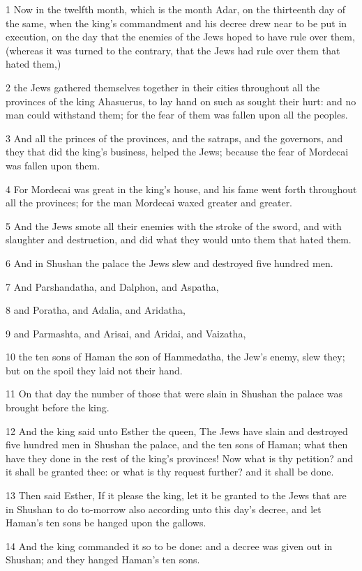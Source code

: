 \par 1 Now in the twelfth month, which is the month Adar, on the thirteenth day of the same, when the king's commandment and his decree drew near to be put in execution, on the day that the enemies of the Jews hoped to have rule over them, (whereas it was turned to the contrary, that the Jews had rule over them that hated them,)
\par 2 the Jews gathered themselves together in their cities throughout all the provinces of the king Ahasuerus, to lay hand on such as sought their hurt: and no man could withstand them; for the fear of them was fallen upon all the peoples.
\par 3 And all the princes of the provinces, and the satraps, and the governors, and they that did the king's business, helped the Jews; because the fear of Mordecai was fallen upon them.
\par 4 For Mordecai was great in the king's house, and his fame went forth throughout all the provinces; for the man Mordecai waxed greater and greater.
\par 5 And the Jews smote all their enemies with the stroke of the sword, and with slaughter and destruction, and did what they would unto them that hated them.
\par 6 And in Shushan the palace the Jews slew and destroyed five hundred men.
\par 7 And Parshandatha, and Dalphon, and Aspatha,
\par 8 and Poratha, and Adalia, and Aridatha,
\par 9 and Parmashta, and Arisai, and Aridai, and Vaizatha,
\par 10 the ten sons of Haman the son of Hammedatha, the Jew's enemy, slew they; but on the spoil they laid not their hand.
\par 11 On that day the number of those that were slain in Shushan the palace was brought before the king.
\par 12 And the king said unto Esther the queen, The Jews have slain and destroyed five hundred men in Shushan the palace, and the ten sons of Haman; what then have they done in the rest of the king's provinces! Now what is thy petition? and it shall be granted thee: or what is thy request further? and it shall be done.
\par 13 Then said Esther, If it please the king, let it be granted to the Jews that are in Shushan to do to-morrow also according unto this day's decree, and let Haman's ten sons be hanged upon the gallows.
\par 14 And the king commanded it so to be done: and a decree was given out in Shushan; and they hanged Haman's ten sons.
